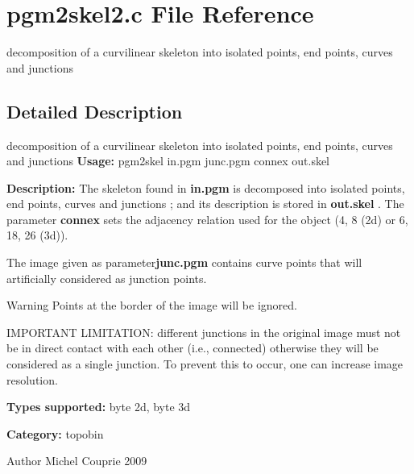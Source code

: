 \section{pgm2skel2.c File Reference}
\label{pgm2skel2_8c}


decomposition of a curvilinear skeleton into isolated points, end points, curves and junctions  




\subsection{Detailed Description}
decomposition of a curvilinear skeleton into isolated points, end points, curves and junctions {\bfseries Usage:} pgm2skel in.pgm junc.pgm connex out.skel

{\bfseries Description:} The skeleton found in {\bfseries in.pgm} is decomposed into isolated points, end points, curves and junctions ; and its description is stored in {\bfseries out.skel} . The parameter {\bfseries connex} sets the adjacency relation used for the object (4, 8 (2d) or 6, 18, 26 (3d)).

The image given as parameter{\bfseries junc.pgm} contains curve points that will artificially considered as junction points.

\begin{DoxyWarning}{Warning}
Points at the border of the image will be ignored.

IMPORTANT LIMITATION: different junctions in the original image must not be in direct contact with each other (i.e., connected) otherwise they will be considered as a single junction. To prevent this to occur, one can increase image resolution.
\end{DoxyWarning}
{\bfseries Types supported:} byte 2d, byte 3d

{\bfseries Category:} topobin

\begin{DoxyAuthor}{Author}
Michel Couprie 2009 
\end{DoxyAuthor}
